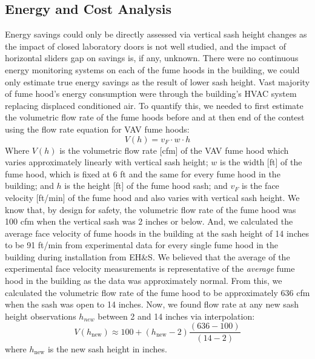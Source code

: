 \documentclass[12pt, twocolumn]{article}
\begin{document}
\subsection*{Energy and Cost Analysis}\label{Sec:Energy}
Energy savings could only be directly assessed via vertical sash height changes as the impact of closed laboratory doors is not well studied, and the impact of horizontal sliders gap on savings is, if any, unknown. There were no continuous energy monitoring systems on each of the fume hoods in the building, we could only estimate true energy savings as the result of lower sash height. Vast majority of fume hood's energy consumption were through the building's HVAC system replacing displaced conditioned air. To quantify this, we needed to first estimate the volumetric flow rate of the fume hoods before and at then end of the contest using the flow rate equation for VAV fume hoods:
\begin{equation}\label{Eq:Flowrate}
V(h) = v_F \cdot w \cdot h
\end{equation}
\newline
Where $V(h)$ is the volumetric flow rate [cfm] of the VAV fume hood which varies approximately linearly with vertical sash height; $w$ is the width [ft] of the fume hood, which is fixed at 6 ft and the same for every fume hood in the building; and $h$ is the height [ft] of the fume hood sash; and $v_F$ is the face velocity [ft/min] of the fume hood and also varies with vertical sash height. We know that, by design for safety, the volumetric flow rate of the fume hood was 100 cfm when the vertical sash was 2 inches or below. And, we calculated the average face velocity of fume hoods in the building at the sash height of 14 inches to be 91 ft/min from experimental data for every single fume hood in the building during installation from EH\&S.  We believed that the average of the experimental face velocity measurements is representative of the \textit{average} fume hood in the building as the data was approximately normal. From this, we calculated the volumetric flow rate of the fume hood to be approximately 636 cfm when the sash was open to 14 inches. Now, we found flow rate at any new sash height observations $h_{new}$ between 2 and 14 inches via interpolation:
\begin{equation}\label{Eq:NewFaceVelocities}
V(h_\text{new}) \approx 100 + (h_\text{new} - 2)\frac{(636 - 100)}{(14 - 2)}
\end{equation}
where $h_{\text{new}}$ is the new sash height in inches. 
\end{document}

